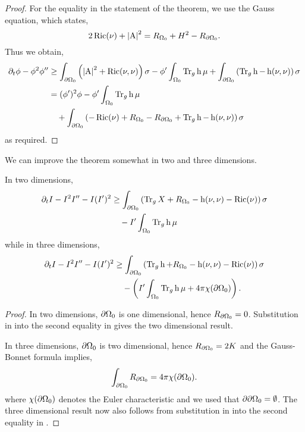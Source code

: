 \documentclass{amsart}
\begin{document}
\begin{proof}
For the equality in the statement of the theorem, we use the Gauss equation, which states,
\[
2 \operatorname{Ric}(\nu) + \left|{\operatorname{A}}\right|^2 = R_{\Omega_0} + H^2 - R_{\partial {\Omega_0}}.
\]
Thus we obtain,
\[
\begin{split}
\partial_t \phi - \phi^2 \phi'' &\geq \int_{\partial {\Omega_0}} \left(\left|{\operatorname{A}}\right|^2 + \operatorname{Ric}(\nu, \nu)\right) \sigma  - \phi'\int_{\Omega_0} \operatorname{Tr}_g \operatorname{h} \mu + \int_{\partial {\Omega_0}} \left(\operatorname{Tr}_g \operatorname{h} - \operatorname{h}(\nu, \nu)\right) \sigma \\
&= (\phi')^2 \phi - \phi'\int_{\Omega_0} \operatorname{Tr}_g \operatorname{h} \mu \\
&\quad + \int_{\partial {\Omega_0}} \left(-\operatorname{Ric}(\nu) + R_{\Omega_0} - R_{\partial {\Omega_0}} + \operatorname{Tr}_g \operatorname{h} - \operatorname{h}(\nu, \nu)\right) \sigma
\end{split}
\]
as required.
\end{proof}

We can improve the theorem somewhat in two and three dimensions.

\begin{cor}
\label{cor:low_dim_general_viscosity}
In two dimensions,
\[
\begin{split}
\partial_t I - I^2 I'' - I(I')^2 &\geq \int_{\partial {\Omega_0}} \left(\operatorname{Tr}_g X + R_{\Omega_0} - \operatorname{h}(\nu, \nu) - \operatorname{Ric}(\nu)\right)\sigma \\
&\quad - I'\int_{\Omega_0} \operatorname{Tr}_g \operatorname{h} \mu
\end{split}
\]
while in three dimensions,
\[
\begin{split}
\partial_t I - I^2 I'' - I(I')^2 &\geq \int_{\partial {\Omega_0}} \left(\operatorname{Tr}_g \operatorname{h} + R_{\Omega_0} - \operatorname{h}(\nu, \nu) - \operatorname{Ric}(\nu)\right)\sigma \\
&\quad - \left(I'\int_{\Omega_0} \operatorname{Tr}_g \operatorname{h} \mu +  4\pi \chi(\partial {\Omega_0})\right).
\end{split}
\]
\end{cor}

\begin{proof}
In two dimensions, \(\partial {\Omega_0}\) is one dimensional, hence \(R_{\partial {\Omega_0}} = 0\). Substitution in into the second equality in  gives the two dimensional result.

In three dimensions, \(\partial {\Omega_0}\) is two dimensional, hence \(R_{\partial {\Omega_0}} = 2K\) and the Gauss-Bonnet formula implies,
\[
\int_{\partial {\Omega_0}} R_{\partial {\Omega_0}} = 4\pi \chi(\partial {\Omega_0}).
\]
where \(\chi(\partial {\Omega_0})\) denotes the Euler characteristic and we used that \(\partial {\partial {\Omega_0}} = \emptyset\). The three dimensional result now also follows from substitution in into the second equality in .
\end{proof}
\end{document}
